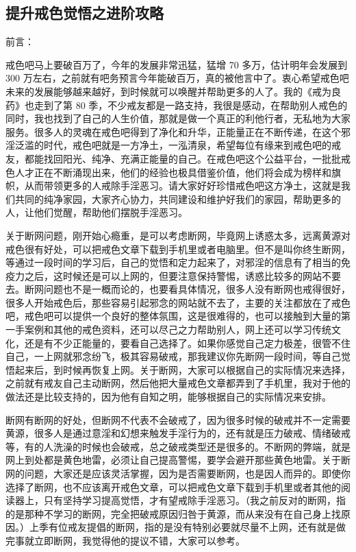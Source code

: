 \subsection{提升戒色觉悟之进阶攻略}

前言：

戒色吧马上要破百万了，今年的发展非常迅猛，猛增 70 多万，估计明年会发展到 300 万左右，之前就有吧务预言今年能破百万，真的被他言中了。衷心希望戒色吧未来的发展能够越来越好，到时候就可以唤醒并帮助更多的人了。我的《戒为良药》也走到了第 80 季，不少戒友都是一路支持，我很是感动，在帮助别人戒色的同时，我也找到了自己的人生价值，那就是做一个真正的利他行者，无私地为大家服务。很多人的灵魂在戒色吧得到了净化和升华，正能量正在不断传递，在这个邪淫泛滥的时代，戒色吧就是一方净土，一泓清泉，希望每位有缘来到戒色吧的戒友，都能找回阳光、纯净、充满正能量的自己。在戒色吧这个公益平台，一批批戒色人才正在不断涌现出来，他们的经验也极具借鉴价值，他们将会成为榜样和旗帜，从而带领更多的人戒除手淫恶习。请大家好好珍惜戒色吧这方净土，这就是我们共同的纯净家园，大家齐心协力，共同建设和维护好我们的家园，帮助更多的人，让他们觉醒，帮助他们摆脱手淫恶习。

关于断网问题，刚开始心瘾重，是可以考虑断网，毕竟网上诱惑太多，远离黄源对戒色很有好处，可以把戒色文章下载到手机里或者电脑里。但不是叫你终生断网，等通过一段时间的学习后，自己的觉悟和定力起来了，对邪淫的信息有了相当的免疫力之后，这时候还是可以上网的，但要注意保持警惕，诱惑比较多的网站不要去。断网问题也不是一概而论的，也要看具体情况，很多人没有断网也戒得很好，很多人开始戒色后，那些容易引起邪念的网站就不去了，主要的关注都放在了戒色吧，戒色吧可以提供一个良好的整体氛围，这是很难得的，也可以接触到大量的第一手案例和其他的戒色资料，还可以尽己之力帮助别人，网上还可以学习传统文化，还是有不少正能量的，要看自己选择了。如果你感觉自己定力极差，很管不住自己，一上网就邪念纷飞，极其容易破戒，那我建议你先断网一段时间，等自己觉悟起来后，到时候再恢复上网。关于断网，大家可以根据自己的实际情况来选择，之前就有戒友自己主动断网，然后他把大量戒色文章都弄到了手机里，我对于他的做法还是比较支持的，因为他有自知之明，能够根据自己的实际情况来安排。

断网有断网的好处，但断网不代表不会破戒了，因为很多时候的破戒并不一定需要黄源，很多人是通过意淫和幻想来触发手淫行为的，还有就是压力破戒、情绪破戒等，有的人洗澡的时候也会破戒，总之破戒类型还是很多的。不断网的弊端，就是网上到处都是黄色地雷，必须让自己提高警惕，要学会避开那些黄色地雷。关于断网的问题，大家还是应该灵活掌握，因为是否需要断网，也是因人而异的。即使你选择了断网，也不应该离开戒色文章，可以把戒色文章下载到手机里或者其他的阅读器上，只有坚持学习提高觉悟，才有望戒除手淫恶习。（我之前反对的断网，指的是那种不学习的断网，完全把破戒原因归咎于黄源，而从来没有在自己身上找原因。）上季有位戒友提倡的断网，指的是没有特别必要就尽量不上网，还有就是做完事就立即断网，我觉得他的提议不错，大家可以参考。

